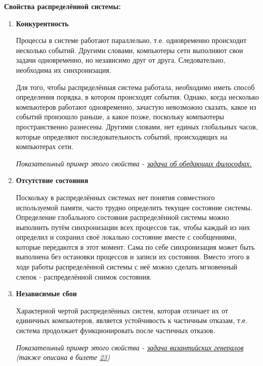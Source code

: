 \textbf{ Свойства распределённой системы:}
\begin{enumerate}
\item \textbf{Конкурентность}

Процессы в системе работают параллельно, т.е. одновременно происходит несколько событий. Другими словами, компьютеры сети выполняют свои задачи одновременно, но независимо друг от друга. Следовательно, необходима их синхронизация.

Для того, чтобы распределённая система работала, необходимо иметь способ определения порядка, в котором происходят события. Однако, когда несколько компьютеров работают одновременно, зачастую невозможно сказать, какое из событий произошло раньше, а какое позже, поскольку компьютеры пространственно разнесены. Другими словами, нет единых глобальных часов, которые определяют последовательность событий, происходящих на компьютерах сети.

\textit{Показательный пример этого свойства - \textcolor{blue}{\href{https://clck.ru/puqyK}{задача об обедающих философах.}}}

\item \textbf{ Отсутствие состояния}

Поскольку в распределённых системах нет понятия совместного используемой памяти, часто трудно определить текущее состояние системы. Определение глобального состояния распределённой системы можно выполнить путём синхронизации всех процессов так, чтобы каждый из них определил и сохранил своё локально состояние вместе с сообщениями, которые передаются в этот момент. Сама по себе синхронизация может быть выполнена без остановки процессов и записи их состояния. Вместо этого в ходе работы распределённой системы с неё можно сделать мгновенный слепок - распределённой снимок состояния.

\item \textbf{ Независимые сбои}

Характерной чертой распределённых систем, которая отличает их от единичных компьютеров, является устойчивость к частичным отказам, т.е. система продолжает функционировать после частичных отказов.

\textit{Показательный пример этого свойства - \textcolor{blue}{\href{https://clck.ru/JVS7z}{задача византийских генералов}} (также описана в билете \hyperlink{Byzantine_fault}{23})}\\
\end{enumerate}

